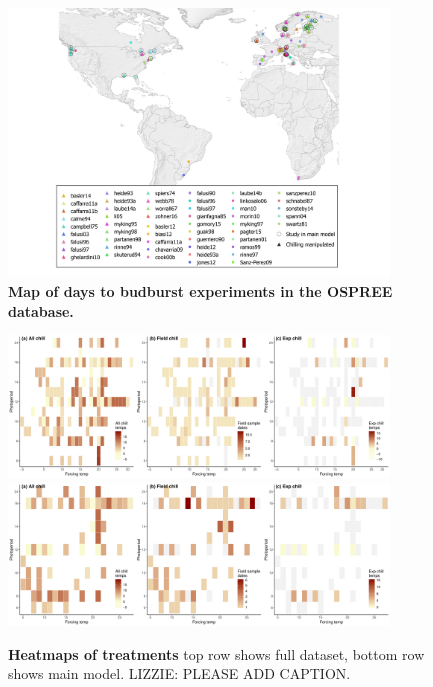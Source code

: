 \documentclass{article}
\begin{document}
\newpage
\begin{figure}[h!]
\centering
\noindent \includegraphics[width=0.9\textwidth]{..//..//analyses/bb_analysis/figures/ospree_locations5thin.png}
\caption{\textbf{Map of days to budburst experiments in the OSPREE database.}}
\label{fig:map}
\end{figure}

\newpage
\begin{figure}[h!]
\centering
\noindent \includegraphics[width=0.9\textwidth]{..//..//analyses/bb_analysis/figures/studydesign/studydesign_heat3panelallsppmodel.pdf}
\noindent \includegraphics[width=0.9\textwidth]{..//..//analyses/bb_analysis/figures/studydesign/studydesign_heat3panelmainmodel.pdf}
\caption{\textbf{Heatmaps of treatments} top row shows full dataset, bottom row shows main model. LIZZIE: PLEASE ADD CAPTION.}
\label{fig:treatheatmaps} %
\end{figure}
\end{document}
